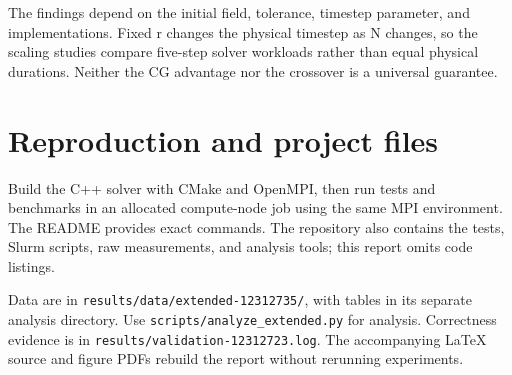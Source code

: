 \documentclass[11pt]{article}
\begin{document}
The findings depend on the initial field, tolerance, timestep parameter, and implementations. Fixed r changes the physical timestep as N changes, so the scaling studies compare five-step solver workloads rather than equal physical durations. Neither the CG advantage nor the crossover is a universal guarantee.

\section{Reproduction and project files}

Build the C++ solver with CMake and OpenMPI, then run tests and benchmarks in an allocated compute-node job using the same MPI environment. The README provides exact commands. The repository also contains the tests, Slurm scripts, raw measurements, and analysis tools; this report omits code listings.

Data are in \texttt{results/data/extended-12312735/}, with tables in its separate analysis directory. Use \texttt{scripts/analyze\_extended.py} for analysis. Correctness evidence is in \texttt{results/validation-12312723.log}. The accompanying LaTeX source and figure PDFs rebuild the report without rerunning experiments.
\end{document}
